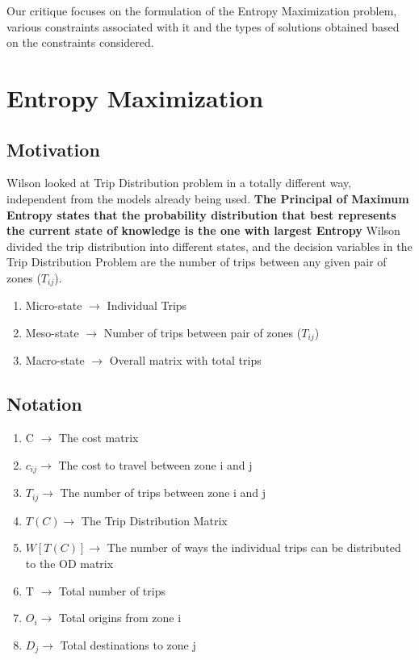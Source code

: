 \documentclass[12pt]{article}
\begin{document}
\newline Our critique focuses on the formulation of the Entropy Maximization problem, various constraints associated with it and the types of solutions obtained based on the constraints considered.
\newpage

\section{Entropy Maximization}


\subsection{Motivation}

Wilson looked at Trip Distribution problem in a totally different way, independent from the models already being used.
\textbf{The Principal of Maximum Entropy states that the probability distribution that best represents the current state of knowledge is the one with largest Entropy} 
\frameboxend
Wilson divided the trip distribution into different states, and the decision variables in the Trip Distribution Problem are the number of trips between any given pair of zones ($T_{ij}$). 
\begin{enumerate}
    \item Micro-state $\rightarrow$ Individual Trips
    \item Meso-state $\rightarrow$ Number of trips between pair of zones ($T_{ij}$)
    \item Macro-state $\rightarrow$ Overall matrix with total trips
\end{enumerate}
\vspace{-5mm}
\subsection{Notation}
\begin{enumerate}
    \item C $\rightarrow$ The cost matrix
    \item $c_{ij} \rightarrow$ The cost to travel between zone i and j
    \item $T_{ij} \rightarrow$ The number of trips between zone i and j
    \item $T(C) \rightarrow$ The Trip Distribution Matrix
    \item $W[T(C)] \rightarrow$ The number of ways the individual trips can be distributed to the OD matrix  
    \item T $\rightarrow$ Total number of trips
    \item $O_{i} \rightarrow$ Total origins from zone i
    \item $D_{j} \rightarrow$ Total destinations to zone j
\end{enumerate}
\end{document}
